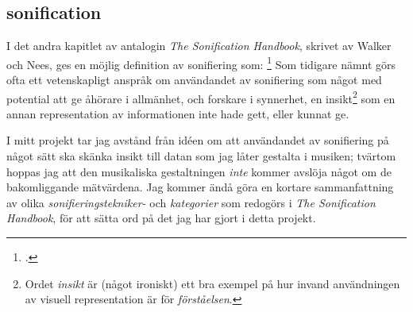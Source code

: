 \documentclass[11pt, a4paper]{article} %
\begin{document}



\subsection*{\gls{sonification}}

I det andra kapitlet av antalogin \emph{The Sonification Handbook}, skrivet av Walker och Nees, ges en möjlig definition av sonifiering som: 
\footcite[9]{hermann_theory_2011}
Som tidigare nämnt görs ofta ett vetenskapligt anspråk om användandet av sonifiering som något med potential att ge åhörare i allmänhet, och forskare i synnerhet, en insikt\footnote{Ordet \emph{insikt} är (något ironiskt) ett bra exempel på hur invand användningen av visuell representation är för \emph{förståelsen}.} som en annan representation av informationen inte hade gett, eller kunnat ge.  

I mitt projekt tar jag avstånd från idéen om att användandet av sonifiering på något sätt ska skänka insikt till datan som jag låter gestalta i musiken; tvärtom hoppas jag att den musikaliska gestaltningen \emph{inte} kommer avslöja något om de bakomliggande mätvärdena. Jag kommer ändå göra en kortare sammanfattning av olika \emph{sonifieringstekniker- } och \emph{kategorier} som redogörs i \emph{The Sonification Handbook}, för att sätta ord på det jag har gjort i detta projekt.%
\end{document}

